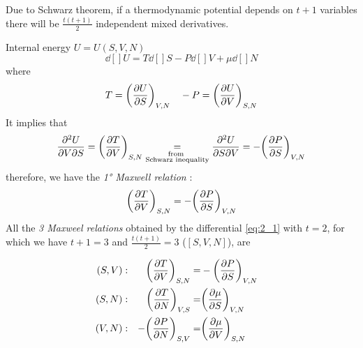 \documentclass[../../Main/Main.tex]{subfiles}
\begin{document}
Due to Schwarz theorem, if a thermodynamic potential depends on \( t+1 \) variables there will be \( \frac{t(t+1)}{2} \)  independent mixed derivatives.
\begin{example}{Internal energy \( U=U(S,V,N)\)}{}
\begin{equation}
  \dd[]{U} = T \dd[]{S} - P \dd[]{V} + \mu \dd[]{N}
  \label{eq:2_1}
\end{equation}
where
\begin{equation*}
  T = \qty(\pdv{U}{S} )_{V,N} \quad  -P = \qty(\pdv{U}{V} )_{S,N}
\end{equation*}
 It implies that
\begin{equation*}
        \pdv{U}{V}{S} = \qty(\pdv{T}{V} )_{S,N} \underset{\substack{ \text{from } \\  \text{Schwarz inequality} } }{=} \pdv{U}{S}{V}  =-\qty(\pdv{P}{S} )_{V,N}
\end{equation*}
therefore, we have the \emph{1° Maxwell relation} :
\begin{equation*}
  \qty(\pdv{T}{V} )_{S,N} = -\qty(\pdv{P}{S} )_{V,N}
\end{equation*}
All the \emph{3 Maxweel relations} obtained by the differential \eqref{eq:2_1}
with \( t=2 \), for which we have \( t+1=3 \) and \( \frac{t(t+1)}{2}=3 \) (\( [S,V,N] \)), are

\begin{subequations}
\begin{align}
  (S,V) &:& \qty(\pdv{T}{V} )_{S,N} =& - \qty(\pdv{P}{S} )_{V,N} & \\
  (S,N) &:& \qty(\pdv{T}{N} )_{V,S} =& \qty(\pdv{\mu }{S} )_{V,N} &\\
  (V,N) &:& -\qty(\pdv{P}{N} )_{S,V} =& \qty(\pdv{\mu }{V} )_{S,N} &
 \end{align}
\label{}
\end{subequations}
\end{example}
\end{document}
